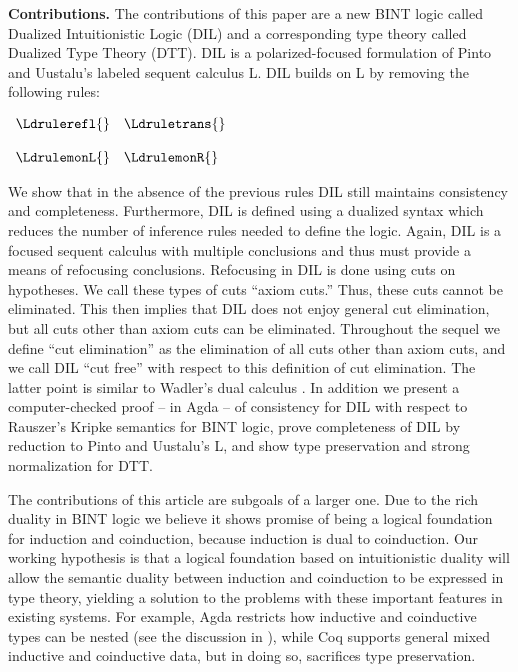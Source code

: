 \textbf{Contributions.} The contributions of this paper are a new BINT
logic called Dualized Intuitionistic Logic (DIL) and a corresponding
type theory called Dualized Type Theory (DTT).  DIL is a
polarized-focused formulation of Pinto and Uustalu's labeled sequent
calculus L.  DIL builds on L by removing the following rules:
\begin{center}
  \begin{math}
    \begin{array}{lll}
      \Ldrulerefl{} & \Ldruletrans{}\\
      & \\
      \LdrulemonL{} & \LdrulemonR{}   
    \end{array}
  \end{math}
\end{center} 
We show that in the absence of the previous rules DIL still maintains
consistency and completeness.  Furthermore, DIL is defined using a
dualized syntax which reduces the number of inference rules needed to
define the logic.  Again, DIL is a focused sequent calculus with
multiple conclusions and thus must provide a means of refocusing
conclusions.  Refocusing in DIL is done using cuts on hypotheses. We
call these types of cuts ``axiom cuts.''  Thus, these cuts cannot be
eliminated.  This then implies that DIL does not enjoy general cut
elimination, but all cuts other than axiom cuts can be
eliminated. Throughout the sequel we define ``cut elimination'' as the
elimination of all cuts other than axiom cuts, and we call DIL ``cut
free'' with respect to this definition of cut elimination. The latter
point is similar to Wadler's dual calculus \cite{Wadler:2005}.  In
addition we present a computer-checked proof -- in Agda -- of
consistency for DIL with respect to Rauszer's Kripke semantics for
BINT logic, prove completeness of DIL by reduction to Pinto and
Uustalu's L, and show type preservation and strong normalization for
DTT.

The contributions of this article are subgoals of a larger one.  Due
to the rich duality in BINT logic we believe it shows promise of being
a logical foundation for induction and coinduction, because induction
is dual to coinduction. Our working hypothesis is that a logical
foundation based on intuitionistic duality will allow the semantic
duality between induction and coinduction to be expressed in type
theory, yielding a solution to the problems with these important
features in existing systems.  For example, Agda restricts how
inductive and coinductive types can be nested (see the discussion in
\cite{abel+13}), while Coq supports general mixed inductive and
coinductive data, but in doing so, sacrifices type preservation.

